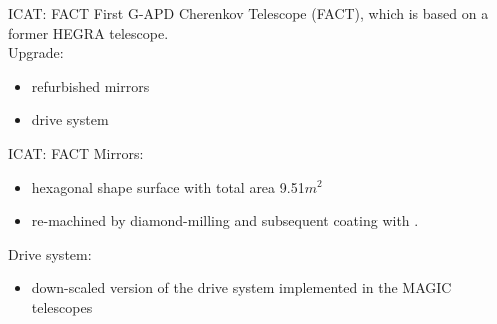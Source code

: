 \documentclass{beamer}
\begin{document}




\begin{frame}{ICAT: FACT}
	First G-APD Cherenkov Telescope (FACT), which is based on a former HEGRA telescope.
	\newline
	\\
	Upgrade:
	\begin{itemize}
		\item refurbished mirrors
		\item drive system
	\end{itemize}
\end{frame}


\begin{frame}{ICAT: FACT}
	Mirrors:
	\begin{itemize}
		\item hexagonal shape surface with total area 9.51$m^2$
		\item re-machined by diamond-milling and subsequent coating with .
	\end{itemize}
	\hfill \break
	Drive system:
	\begin{itemize}
		\item down-scaled version of the drive system implemented in the MAGIC telescopes
	\end{itemize}
\end{frame}
\end{document}
